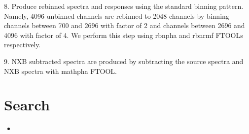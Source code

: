 \documentclass[letterpaper,10pt,english]{sphinxmanual}
\begin{document}
8. Produce rebinned spectra and responses using the standard binning pattern. Namely, 4096 unbinned channels are rebinned to 2048 channels by binning channels between 700 and 2696 with factor of 2 and channels between 2696 and 4096 with factor of 4. We perform this step using rbnpha and rbnrmf FTOOLs respectively.

9. NXB subtracted spectra are produced by subtracting the source spectra and NXB spectra with mathpha FTOOL.


\chapter{Search}
\label{\detokenize{index:search}}\begin{itemize}
\item {} 

\end{itemize}



\renewcommand{\indexname}{Index}
\printindex
\end{document}
